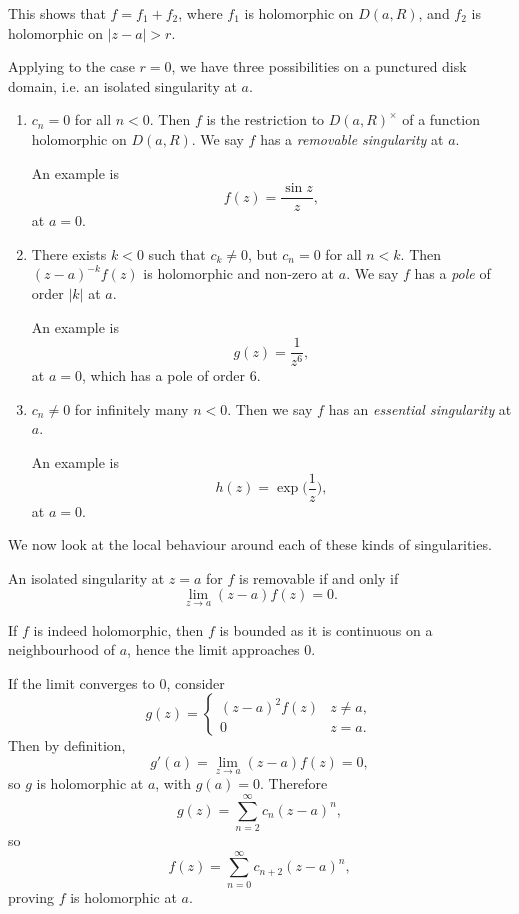 \documentclass[12pt]{article}
\begin{document}
\begin{remark}
	This shows that $f = f_1 + f_2$, where $f_1$ is holomorphic on $D(a, R)$, and $f_2$ is holomorphic on $|z-a| > r$.
\end{remark}

Applying to the case $r = 0$, we have three possibilities on a punctured disk domain, i.e. an isolated singularity at $a$.
\begin{enumerate}
	\item $c_n = 0$ for all $n < 0$. Then $f$ is the restriction to $D(a, R)^{\times}$ of a function holomorphic on $D(a, R)$. We say $f$ has a \emph{removable singularity} at $a$.

		An example is
		\[
		f(z) = \frac{\sin z}{z},
		\]
		at $a = 0$.
	\item There exists $k < 0$ such that $c_k \neq 0$, but $c_n = 0$ for all $n < k$. Then $(z-a)^{-k}f(z)$ is holomorphic and non-zero at $a$. We say $f$ has a \emph{pole} of order $|k|$ at $a$.

		An example is
		\[
		g(z) = \frac{1}{z^{6}},
		\]
		at $a = 0$, which has a pole of order $6$.
	\item $c_n \neq 0$ for infinitely many $n < 0$. Then we say $f$ has an \emph{essential singularity} at $a$.

		An example is
		\[
		h(z) = \exp \biggl( \frac{1}{z} \biggr),
		\]
		at $a = 0$.
\end{enumerate}

We now look at the local behaviour around each of these kinds of singularities.

\begin{proposition}
	An isolated singularity at $z = a$ for $f$ is removable if and only if
	\[
	\lim_{z \to a} (z - a) f(z) = 0.
	\]
\end{proposition}

\begin{proofbox}
	If $f$ is indeed holomorphic, then $f$ is bounded as it is continuous on a neighbourhood of $a$, hence the limit approaches $0$.

	If the limit converges to $0$, consider
	\[
	g(z) =
	\begin{cases}
		(z - a)^2 f(z) & z \neq a,\\
		0 & z = a.
	\end{cases}
	\]
	Then by definition,
	\[
	g'(a) = \lim_{z \to a}(z - a) f(z) = 0,
	\]
	so $g$ is holomorphic at $a$, with $g(a) = 0$. Therefore
	\[
	g(z) = \sum_{n = 2}^{\infty} c_n(z - a)^{n},
	\]
	so
	\[
	f(z) = \sum_{n = 0}^{\infty} c_{n+2}(z - a)^{n},
	\]
	proving $f$ is holomorphic at $a$.
\end{proofbox}
\end{document}
